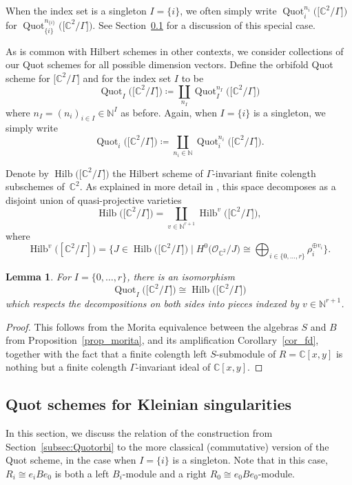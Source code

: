 \documentclass[pdftex]{sigma}%
\newtheorem{Lemma}[Theorem]{Lemma}
\newcommand{\SC}{\mathbb{C}} %
\newcommand{\PiGamma}{B}
\DeclareMathOperator{\Hilb}{\mathrm{Hilb}}
\DeclareMathOperator{\Quot}{\mathrm{Quot}}
\newcommand{\QuotI}[1][ ]{\Quot_I^{#1}}
\newcommand{\QuotInI}{\QuotI[n_I]}
\newcommand{\Quoti}[1][ ]{\Quot_i^{#1}}
\newcommand{\Quotini}{\Quoti[n_i]}
\numberwithin{equation}{section}
\begin{document}
When the index set is a singleton $I=\{i\}$, we
often simply write $\Quotini \big(\big[\SC^2/\Gamma\big]\big)$ for $\Quot_{\{i\}}^{n_{\{i\}}}\big(\big[\SC^2/\Gamma\big]\big)$. See Section~\ref{sect_quot_quot} for a
discussion of this special case.

As is common with Hilbert schemes in other contexts, we
consider collections of our Quot schemes for all
possible dimension vectors. Define the
orbifold Quot scheme for $\big[\SC^2/\Gamma\big]$ and for the index set $I$ to be
\[ \QuotI \big(\big[\SC^2/\Gamma\big]\big)\coloneqq\coprod_{n_I} \QuotInI\big(\big[\SC^2/\Gamma\big]\big) \]
where $n_I=(n_i)_{i \in I} \in \mathbb{N}^{I}$ as before.
Again, when $I=\{i\}$ is a singleton, we simply write
\[
\Quoti \big(\big[\SC^2/\Gamma\big]\big)\coloneqq\coprod_{n_i\in \mathbb{N}}\Quotini \big(\big[\SC^2/\Gamma\big]\big).\]

 Denote by $\Hilb\big(\big[\SC^2/\Gamma\big]\big)$ the Hilbert scheme of $\Gamma$-invariant finite colength subschemes of~$\SC^2$. As explained in more detail in \cite[Section~1.1]{gyenge2018euler}, this space decomposes as a disjoint union of quasi-projective varieties
\[\Hilb\big(\big[\SC^2/\Gamma\big]\big) = \coprod_{v\in \mathbb{N}^{r+1}}\Hilb^v\big(\big[\SC^2/\Gamma\big]\big),
\]
where \[\Hilb^v\big([\SC^2/\Gamma]\big) =\Big\{J\in \Hilb\big(\big[\SC^2/\Gamma\big]\big)\mid H^0\big(\mathcal{O}_{\SC^2}/J\big) \cong \bigoplus_{i\in \{0, \dots, r\}} \rho_i^{\oplus v_i}\Big\}.\]

\begin{Lemma}\label{lem:HilbMor}
For $I=\{0,\dots,r\}$, there is an isomorphism
\[\QuotI \big(\big[\SC^2/\Gamma\big]\big) \cong \Hilb\big(\big[\SC^2/\Gamma\big]\big)\]
which respects the decompositions on both sides into pieces indexed by $v\in \mathbb{N}^{r+1}$.
\end{Lemma}
\begin{proof} This follows from the Morita equivalence between the algebras $S$
and $\PiGamma$ from Proposition~\ref{prop_morita}, and
its amplification Corollary~\ref{cor_fd}, together with the fact that a finite colength left $S$-submodule of $R=\SC[x,y]$ is nothing but a finite colength $\Gamma$-invariant ideal of $\SC[x,y]$.
\end{proof}

\subsection{Quot schemes for Kleinian singularities}
\label{sect_quot_quot}
In this section, we discuss the relation of the construction from Section~\ref{subsec:Quotorbi} to the more classical (commutative) version of the Quot scheme, in the case when $I=\{i\}$ is a singleton.
Note that in this case, $R_i\cong e_i\PiGamma e_0$
 is both a left $B_i$-module and a right $R_0\cong e_0\PiGamma e_0$-module.
\end{document}
